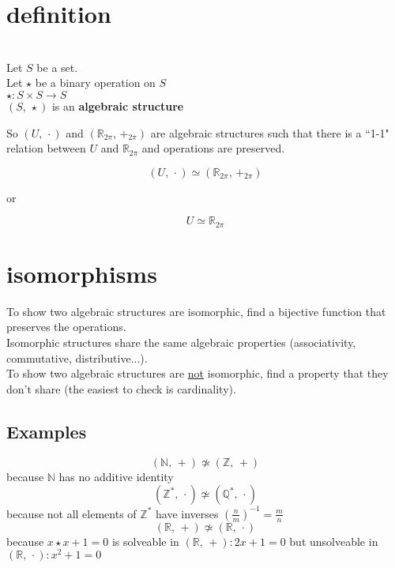 \documentclass{article}
\begin{document}
\section{definition}
    \begin{definition}\label{algebraic structure}
    \hspace{0em}\vspace{-1em}\\
    \tab\tab Let $S$ be a set.\\
    \tab\tab Let $\star$ be a binary operation on $S$\\
    \tab\tab\tab $\star: S \times S \rightarrow S$\\
    \tab\tab $\left(S,\, \star \right)$ is an \textbf{algebraic structure}
    \end{definition}
    \vspace{12pt}
    So $\left(U,\, \cdot\right)$ and $\left(\mathbb{R}_{2\pi},\, +_{2\pi}\right)$ are algebraic structures such that there is a ``1-1" relation between $U$ and $\mathbb{R}_{2\pi}$ and operations are preserved.
    \vspace{8pt}
    
    $$\left(U,\, \cdot\right) \simeq \left(\mathbb{R}_{2\pi},\, +_{2\pi}\right)$$
    \begin{center}or\end{center}
    $$U \simeq \mathbb{R}_{2\pi}$$

\section{isomorphisms}
To show two algebraic structures are isomorphic, find a bijective function that preserves the operations.\\
Isomorphic structures share the same algebraic properties (associativity, commutative, distributive...).\\
To show two algebraic structures are \underline{not} isomorphic, find a property that they don't share (the easiest to check is cardinality).

\subsection{Examples}
\begin{center}
$$\left(\mathbb{N},\, +\right) \not\simeq \left(\mathbb{Z},\, +\right)$$
because $\mathbb{N}$ has no additive identity
$$\left(\mathbb{Z}^{*},\, \cdot\right) \not\simeq \left(\mathbb{Q}^{*},\, \cdot\right)$$
because not all elements of $\mathbb{Z}^*$ have inverses $\left(\frac{n}{m}\right)^{-1} = \frac{m}{n}$
$$\left(\mathbb{R},\, +\right) \not\simeq \left(\mathbb{R},\, \cdot\right)$$
because $x \star x + 1 = 0$ is solveable in $\left(\mathbb{R},\, +\right): 2x + 1 = 0$ but unsolveable in $\left(\mathbb{R},\, \cdot\right): x^2 + 1 = 0$
\end{center}        
\end{document}

